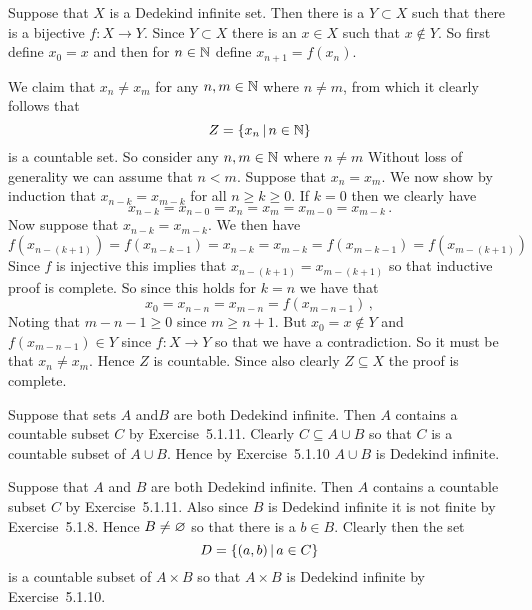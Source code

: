 
\begin{solution}
	Suppose that $X$ is a Dedekind infinite set.
    Then there is a $Y \subset X$ such that there is a bijective $f : X \to Y$.
    Since $Y \subset X$ there is an $x \in X$ such that $x \notin Y$.
    So first define $x_0 = x$ and then for $n \in \mathbb{N}$ define $x_{n+1} = f(x_n)$.

    We claim that $x_n \neq x_m$ for any $n,m \in \mathbb{N}$ where $n \neq m$, from which it clearly follows that
    $$
    Z = \left\{ x_n \,|\, n \in \mathbb{N} \right\}
    $$
    is a countable set.
    So consider any $n,m \in \mathbb{N}$ where $n \neq m$
    Without loss of generality we can assume that $n < m$.
    Suppose that  $x_n = x_m$.
    We now show by induction that $x_{n-k} = x_{m-k}$ for all $n \geq k \geq 0$.
    If $k=0$ then we clearly have
    $$
    x_{n-k} = x_{n-0} = x_n = x_m = x_{m-0} = x_{m-k} \,.
    $$
    Now suppose that $x_{n-k} = x_{m-k}$.
    We then have
    $$
    f(x_{n-(k+1)}) = f(x_{n-k-1}) = x_{n-k} = x_{m-k} = f(x_{m-k-1}) = f(x_{m-(k+1)})
    $$
    Since $f$ is injective this implies that $x_{n-(k+1)} = x_{m-(k+1)}$ so that inductive proof is complete.
    So since this holds for $k=n$ we have that
    $$
    x_0 = x_{n-n} = x_{m-n} = f(x_{m-n-1}) \,,
    $$
    Noting that $m-n-1 \geq 0$ since $m \geq n +1$.
    But $x_0 = x \notin Y$ and $f(x_{m-n-1}) \in Y$ since $f:X \to Y$ so that we have a contradiction.
    So it must be that $x_n \neq x_m$.
    Hence $Z$ is countable.
    Since also clearly $Z \subseteq X$ the proof is complete. \qedsymbol
\end{solution}


\begin{solution}
	Suppose that sets $A$ and$B$ are both Dedekind infinite.
    Then $A$ contains a countable subset $C$ by Exercise~5.1.11.
    Clearly $C \subseteq A \cup B$ so that $C$ is a countable subset of $A \cup B$.
    Hence by Exercise~5.1.10 $A \cup B$ is Dedekind infinite. \qedsymbol
\end{solution}


\begin{solution}
	Suppose that $A$ and $B$ are both Dedekind infinite.
    Then $A$ contains a countable subset $C$ by Exercise~5.1.11.
    Also since $B$ is Dedekind infinite it is not finite by Exercise~5.1.8.
    Hence $B \neq \varnothing$ so that there is a $b \in B$.
    Clearly then the set
    $$
    D = \left\{ (a,b) \,|\, a \in C \right\}
    $$
    is a countable subset of $A \times B$ so that $A \times B$ is Dedekind infinite by Exercise~5.1.10. \qedsymbol
\end{solution}

